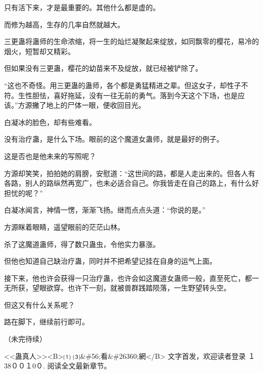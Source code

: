 \begin{this_body}
只有活下来，才是最重要的。其他什么都是虚的。

而修为越高，生存的几率自然就越大。

三更蛊将蛊师的生命浓缩，将一生的灿烂凝聚起来绽放，如同飘零的樱花，易冷的烟火，短暂却又精彩。

但如果没有三更蛊，樱花的幼苗来不及绽放，就已经被铲除了。

“这也不奇怪。用三更蛊的蛊师，各个都是勇猛精进之辈。但这女子，却性子不符。生性胆怯，喜好拖延，没有一往无前的勇气。落到今天这个下场，也是应该。”方源撇了地上的尸体一眼，便收回目光。

白凝冰的脸色，却有些难看。

没有治疗蛊，是什么下场。眼前的这个魔道女蛊师，就是最好的例子。

这是否也是他未来的写照呢？

方源却笑笑，拍拍她的肩膀，安慰道：“这世间的路，都是人走出来的。但各人有各路，别人的路纵然再宽广，也未必适合自己。你我皆走在自己的路上，有什么好担忧的呢？”

白凝冰闻言，神情一愣，渐渐飞扬。继而点点头道：“你说的是。”

方源眯着眼睛，遥望眼前的茫茫山林。

杀了这魔道蛊师，得了数只蛊虫，令他实力暴涨。

但他也知道自己缺治疗蛊，同时并不把希望记挂在自身的运气上面。

接下来，他也许会获得一只治疗蛊，也许会如这魔道女蛊师一般，直至死亡，都一无所获，望眼欲穿。也许下一刻，就被兽群践踏陨落，一生野望转头空。

但这又有什么关系呢？

路在脚下，继续前行即可。

（未完待续）

<<蛊真人>><B>⑴ ⑶\&\#56;看\&\#26360;網</B> 文字首发，欢迎读者登录 １38００１0０. 阅读全文最新章节。

\end{this_body}

